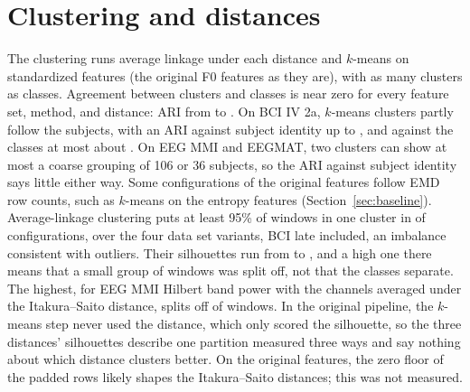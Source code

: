 \section{Clustering and distances}
\label{sec:clustering}

The clustering runs average linkage under each distance and $k$-means on standardized features (the original F0 features as they are), with as many clusters as classes. Agreement between clusters and classes is near zero for every feature set, method, and distance: ARI from  to . On BCI IV 2a, $k$-means clusters partly follow the subjects, with an ARI against subject identity up to , and against the classes at most about . On EEG MMI and EEGMAT, two clusters can show at most a coarse grouping of 106 or 36 subjects, so the ARI against subject identity says little either way. Some configurations of the original features follow EMD row counts, such as $k$-means on the entropy features (Section~\ref{sec:baseline}). Average-linkage clustering puts at least 95\% of windows in one cluster in  of  configurations, over the four data set variants, BCI late included, an imbalance consistent with outliers. Their silhouettes run from  to , and a high one there means that a small group of windows was split off, not that the classes separate. The highest, for EEG MMI Hilbert band power with the channels averaged under the Itakura--Saito distance, splits off  of  windows. In the original pipeline, the $k$-means step never used the distance, which only scored the silhouette, so the three distances' silhouettes describe one partition measured three ways and say nothing about which distance clusters better. On the original features, the zero floor of the padded rows likely shapes the Itakura--Saito distances; this was not measured.
